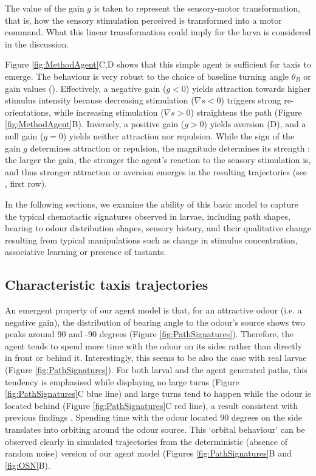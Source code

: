 \documentclass[11pt,a4paper]{article}
\newcommand{\todoML}[1]{\todo[author=ML,color=white, size=\tiny,inline]{#1}}
\begin{document}
The value of the gain $g$ is taken to represent the sensory-motor transformation, that is, how the sensory stimulation perceived is transformed into a motor command. What this linear transformation could imply for the larva is considered in the discussion. 

Figure \ref{fig:MethodAgent}C,D shows that this simple agent is sufficient for taxis to emerge. The behaviour is very robust to the choice of baseline turning angle $\theta_B$ or gain values ().
 Effectively, a negative gain ($g<0$) yields attraction towards higher stimulus intensity because decreasing stimulation ($\nabla s<0$) triggers strong re-orientations, while increasing stimulation ($\nabla s>0$) straightens the path (Figure  \ref{fig:MethodAgent}B). Inversely, a positive gain ($g>0$) yields aversion (D), and a null gain ($g=0$) yields neither attraction nor repulsion. While the sign of the gain $g$ determines attraction or repulsion, the magnitude determines its strength : the larger the gain, the stronger the agent's reaction to the sensory stimulation is, and thus stronger attraction or aversion emerges in the resulting trajectories (see , first row).

In the following sections, we examine the ability of this basic model to capture the typical chemotactic signatures observed in larvae, including path shapes, bearing to odour distribution shapes, sensory history, and their qualitative change resulting from typical manipulations such as change in stimulus concentration, associative learning or presence of tastants. 

\subsection{Characteristic taxis trajectories}
An emergent property of our agent model is that, for an attractive odour (i.e. a negative gain), the distribution of bearing angle to the odour's source shows two peaks around 90 and -90 degrees (Figure \ref{fig:PathSignatures}). Therefore, the agent tends to spend more time with the odour on its sides rather than directly in front or behind it. Interestingly, this seems to be also the case with real larvae (Figure \ref{fig:PathSignatures}).
 For both larval and the agent generated paths, this tendency is emphasised while displaying no large turns (Figure \ref{fig:PathSignatures}C blue line) and large turns tend to happen while the odour is located behind (Figure \ref{fig:PathSignatures}C red line), a result consistent with previous findings \citep{gomez2011active,schleyer2015impact}.
 Spending time with the odour located 90 degrees on the side translates into orbiting around the odour source. This ‘orbital behaviour’ can be observed clearly in simulated trajectories from the deterministic (absence of random noise) version of our agent model (Figures \ref{fig:PathSignatures}B and \ref{fig:OSN}B).
\end{document}
